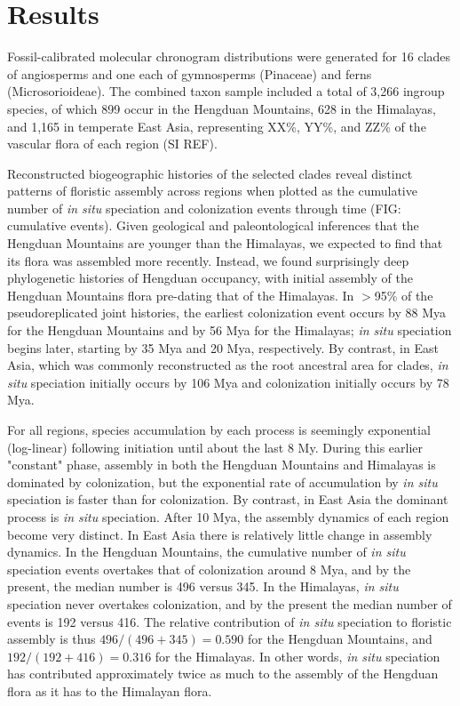\section{Results}

Fossil-calibrated molecular chronogram distributions were generated for 16 clades of angiosperms and one each of gymnosperms (Pinaceae) and ferns (Microsorioideae). The combined taxon sample included a total of 3,266 ingroup species, of which 899 occur in the Hengduan Mountains, 628 in the Himalayas, and 1,165 in temperate East Asia, representing XX\%, YY\%, and ZZ\% of the vascular flora of each region (SI REF).

Reconstructed biogeographic histories of the selected clades reveal distinct patterns of floristic assembly across regions when plotted as the cumulative number of \textit{in situ} speciation and colonization events through time (FIG: cumulative events). Given geological and paleontological inferences that the Hengduan Mountains are younger than the Himalayas, we expected to find that its flora was assembled more recently. Instead, we found surprisingly deep phylogenetic histories of Hengduan occupancy, with initial assembly of the Hengduan Mountains flora pre-dating that of the Himalayas. In $>$95\% of the pseudoreplicated joint histories, the earliest colonization event occurs by 88 Mya for the Hengduan Mountains and by 56 Mya for the Himalayas; \textit{in situ} speciation begins later, starting by 35 Mya and 20 Mya, respectively. By contrast, in East Asia, which was commonly reconstructed as the root ancestral area for clades, \textit{in situ} speciation initially occurs by 106 Mya and colonization initially occurs by 78 Mya.

For all regions, species accumulation by each process is seemingly exponential (log-linear) following initiation until about the last 8 My. During this earlier "constant" phase, assembly in both the Hengduan Mountains and Himalayas is dominated by colonization, but the exponential rate of accumulation by \textit{in situ} speciation is faster than for colonization. By contrast, in East Asia the dominant process is \textit{in situ} speciation.  After 10 Mya, the assembly dynamics of each region become very distinct. In East Asia there is relatively little change in assembly dynamics. In the Hengduan Mountains, the cumulative number of \textit{in situ} speciation events overtakes that of colonization around 8 Mya, and by the present, the median number is 496 versus 345. In the Himalayas, \textit{in situ} speciation never overtakes colonization, and by the present the median number of events is 192 versus 416. The relative contribution of \textit{in situ} speciation to floristic assembly is thus $496/(496+345) = 0.590$ for the Hengduan Mountains, and $192/(192+416) = 0.316$ for the Himalayas. In other words, \textit{in situ} speciation has contributed approximately twice as much to the assembly of the Hengduan flora as it has to the Himalayan flora.

